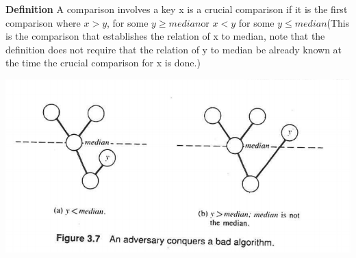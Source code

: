\documentclass[a4paper,10pt,titlepage]{report}
\begin{document}
\textbf{Definition} A comparison involves a key x is a crucial comparison if it is the first comparison where $x>y$, for some $y \geq median $or $x < y$ for some $y \leq median$(This is the comparison that establishes the relation of x to median, note that the definition does not require that the relation of y to median be already known at the time the crucial comparison for x is done.)


\includegraphics[scale=0.4]{notes_3_7.png}
\end{document}
